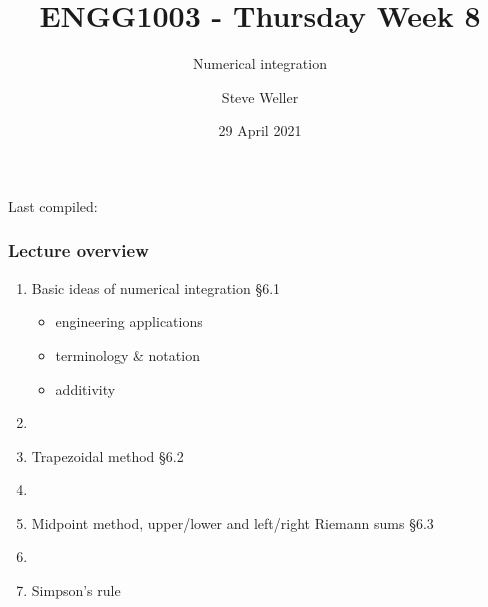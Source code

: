 \documentclass[english,14pt]{beamer}
\title{ENGG1003 - Thursday Week 8}
\subtitle{Numerical integration }%
\author{Steve Weller}
\institute{University of Newcastle}
\date{29 April 2021}
\newcommand\red[1]{{\color{red} #1}}
\begin{document}
\begin{flushleft}
{\scriptsize Last compiled:~\DTMnow}
\vspace*{-5mm}
\end{flushleft}
\framebreak


\begin{frame}[fragile]

\frametitle{Lecture overview}
\begin{enumerate}
	\item Basic ideas of numerical integration \red{\S6.1}
	\begin{itemize}
		\item engineering applications
		\item terminology \& notation
		\item additivity
	\end{itemize}
	
	\item[]
	
	\item Trapezoidal method \red{\S6.2}
	
	\item[]
	
	\item Midpoint method, upper/lower and left/right Riemann sums \red{\S6.3}
	
	\item[]
	
	\item Simpson's rule
	
\end{enumerate}

\end{frame}

\end{document}

